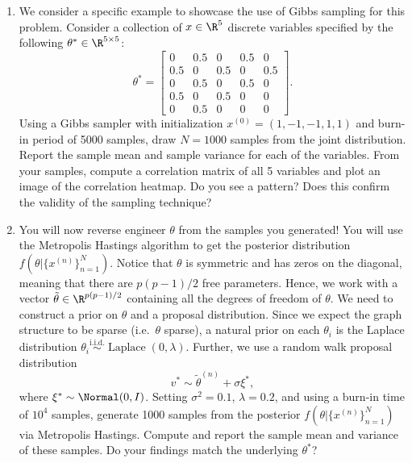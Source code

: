 \begin{enumerate}
\begin{enumerate}
      \textbf{Remark:} Notice that sampling from the conditional distribution is tractable.
      Why? This suggests that Gibbs sampling could be used to draw samples from the joint
      distribution.

    \item We consider a specific example to showcase the use of Gibbs sampling for this
      problem. Consider a collection of $x \in \R^5$ discrete variables specified by the
      following $\theta^* \in \R^{5 \times 5}$:
      \[
        \theta^* =
        \begin{bmatrix}
          0   & 0.5 & 0   & 0.5 & 0   \\
          0.5 & 0   & 0.5 & 0   & 0.5 \\
          0   & 0.5 & 0   & 0.5 & 0   \\
          0.5 & 0   & 0.5 & 0   & 0   \\
          0   & 0.5 & 0   & 0   & 0
        \end{bmatrix}.
      \]
      Using a Gibbs sampler with initialization $x^{(0)} = (1, -1, -1, 1, 1)$ and burn-in
      period of 5000 samples, draw $N = 1000$ samples from the joint distribution. Report the
      sample mean and sample variance for each of the variables. From your samples, compute a
      correlation matrix of all 5 variables and plot an image of the correlation heatmap. Do
      you see a pattern? Does this confirm the validity of the sampling technique?

    \item You will now reverse engineer $\theta$ from the samples you generated! You will use
      the Metropolis Hastings algorithm to get the posterior distribution
      $f(\theta | \{x^{(n)}\}_{n=1}^N)$. Notice that $\theta$ is symmetric and has zeros on
      the diagonal, meaning that there are $p(p-1)/2$ free parameters. Hence, we work with a
      vector $\tilde{\theta} \in \R^{p(p-1)/2}$ containing all the degrees of freedom of
      $\theta$. We need to construct a prior on $\theta$ and a proposal distribution. Since we
      expect the graph structure to be sparse (i.e.\ $\theta$ sparse), a natural prior on each
      $\theta_i$ is the Laplace distribution $\theta_i \overset{\mathrm{i.i.d.}}{\sim}
      \operatorname{Laplace}(0, \lambda)$. Further, we use a random walk proposal distribution
      \[
        v^* \sim \tilde{\theta}^{(n)} + \sigma \xi^*,
      \]
      where $\xi^* \sim \Normal(0, I)$. Setting $\sigma^2 = 0.1$, $\lambda = 0.2$, and using
      a burn-in time of $10^4$ samples, generate 1000 samples from the posterior
      $f(\theta | \{x^{(n)}\}_{n=1}^N)$ via Metropolis Hastings. Compute and report the
      sample mean and variance of these samples. Do your findings match the underlying
      $\theta^*$?
  \end{enumerate}


\end{enumerate}

